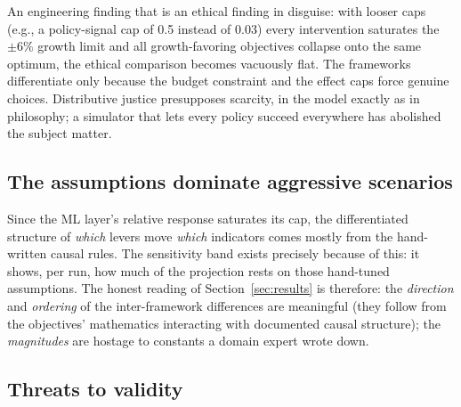 \documentclass[11pt,a4paper]{article}
\begin{document}
An engineering finding that is an ethical finding in disguise: with looser
caps (e.g., a policy-signal cap of 0.5 instead of 0.03) every intervention
saturates the $\pm6\%$ growth limit and all growth-favoring objectives collapse
onto the same optimum, the ethical comparison becomes vacuously flat. The
frameworks differentiate only because the budget constraint and the effect
caps force genuine choices. Distributive justice presupposes scarcity, in the
model exactly as in philosophy; a simulator that lets every policy succeed
everywhere has abolished the subject matter.

\subsection{The assumptions dominate aggressive scenarios}

Since the ML layer's relative response saturates its cap, the differentiated
structure of \emph{which} levers move \emph{which} indicators comes mostly
from the hand-written causal rules. The sensitivity band exists precisely
because of this: it shows, per run, how much of the projection rests on those
hand-tuned assumptions. The honest reading of Section~\ref{sec:results} is
therefore: the \emph{direction} and \emph{ordering} of the inter-framework
differences are meaningful (they follow from the objectives' mathematics
interacting with documented causal structure); the \emph{magnitudes} are
hostage to constants a domain expert wrote down.

\subsection{Threats to validity}
\label{sec:threats}
\end{document}
